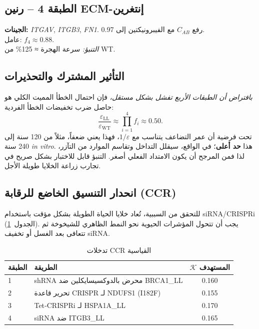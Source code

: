 \documentclass[11pt,a4paper]{article}
\newcommand{\REL}{\mathcal{K}}
\begin{document}
	\subsection{الطبقة 4 – رنين ECM-إنتغرين}
	\textbf{الجينات:} \emph{ITGAV}, \emph{ITGB3}, \emph{FN1}. رفع \(C_{AB}\) مع الفيبرونيكتين إلى 0.97.\\
	عامل: \(f_4 \approx 0.88\).\\
	\textit{التنبؤ:} سرعة الهجرة ≈ 125\% من WT.
	
	\subsection{التأثير المشترك والتحذيرات}
	\textit{بافتراض أن الطبقات الأربع تفشل بشكل مستقل،} فإن احتمال الخطأ المميت الكلي هو حاصل ضرب تخفيضات الخطأ الفردية:
	\[
	\frac{\varepsilon_{\mathrm{LL}}}{\varepsilon_{\mathrm{WT}}} \approx \prod_{i=1}^{4} f_i \approx 0.50.
	\]
	تحت فرضية أن عمر التضاعف يتناسب مع \(1/\varepsilon\)، فهذا يعني ضعفاً، مثلاً من 120 سنة إلى 240 سنة \textit{in vitro}. هذا \textbf{حد أعلى}؛ في الواقع، سيقلل التداخل وتقاسم الموارد من التآزر، لذا فمن المرجح أن يكون الامتداد الفعلي أصغر. التنبؤ قابل للاختبار بشكل صريح في تجارب زراعة الخلايا طويلة الأجل.
	
	\subsection{انحدار التنسيق الخاضع للرقابة (CCR)}
	للتحقق من السببية، تُعاد خلايا الحياة الطويلة بشكل مؤقت باستخدام siRNA/CRISPRi (الجدول~\ref{tab:CCR}). يجب أن تتحول المؤشرات الحيوية نحو النمط الظاهري للشيخوخة ثم تتعافى بعد الغسل أو تخفيف siRNA.
	
	\begin{table}[H]
		\centering
		\caption{تدخلات CCR القياسية}
		\label{tab:CCR}
		\begin{tabular}{@{}llc@{}}
			\toprule
			\textbf{الطبقة} & \textbf{الطريقة} & \(\REL\) \textbf{المستهدف} \\
			\midrule
			1 & shRNA محرض بالدوكسيسايكلين ضد BRCA1\_LL & 0.160 \\
			2 & تحرير قاعدة CRISPR لـ NDUFS1 (I182F) & 0.155 \\
			3 & Tet‑CRISPRi لـ HSPA1A\_LL & 0.170 \\
			4 & siRNA ضد ITGB3\_LL & 0.165 \\
			\bottomrule
		\end{tabular}
	\end{table}
	
\end{document}
